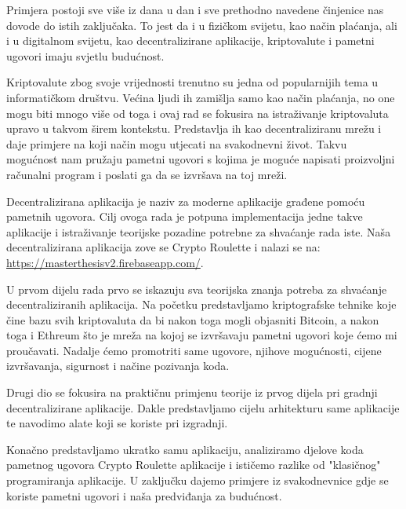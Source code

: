 \documentclass[a4paper,oneside,12pt]{memoir} %
\begin{document}
Primjera postoji sve više iz dana u dan i sve prethodno navedene činjenice nas dovode do istih zaključaka. To jest da i u fizičkom svijetu, kao način plaćanja, ali i u digitalnom svijetu, kao decentralizirane aplikacije, kriptovalute i pametni ugovori imaju svjetlu budućnost.




\pagestyle{empty} %


\begin{sazetak}
Kriptovalute zbog svoje vrijednosti trenutno su jedna od popularnijih tema u informatičkom društvu. Većina ljudi ih zamišlja samo kao način plaćanja, no one mogu biti mnogo više od toga i ovaj rad se fokusira na istraživanje kriptovaluta upravo u takvom širem kontekstu. Predstavlja ih kao decentraliziranu mrežu i daje primjere na koji način mogu utjecati na svakodnevni život. Takvu mogućnost nam pružaju pametni ugovori s kojima je moguće napisati proizvoljni računalni program i poslati ga da se izvršava na toj mreži.

Decentralizirana aplikacija je naziv za moderne aplikacije građene pomoću pametnih ugovora. Cilj ovoga rada je potpuna implementacija jedne takve aplikacije i istraživanje teorijske pozadine potrebne za shvaćanje rada iste. Naša decentralizirana aplikacija zove se Crypto Roulette i nalazi se na: \url{https://masterthesisv2.firebaseapp.com/}.

U prvom dijelu rada prvo se iskazuju sva teorijska znanja potreba za shvaćanje decentraliziranih aplikacija. Na početku predstavljamo kriptografske tehnike koje čine bazu svih kriptovaluta da bi nakon toga mogli objasniti Bitcoin, a nakon toga i Ethreum što je mreža na kojoj se izvršavaju pametni ugovori koje ćemo mi proučavati. Nadalje ćemo promotriti same ugovore, njihove mogućnosti, cijene izvršavanja, sigurnost i načine pozivanja koda.

Drugi dio se fokusira na praktičnu primjenu teorije iz prvog dijela pri gradnji decentralizirane aplikacije. Dakle predstavljamo cijelu arhitekturu same aplikacije te navodimo alate koji se koriste pri izgradnji. 

Konačno predstavljamo ukratko samu aplikaciju, analiziramo djelove koda pametnog ugovora Crypto Roulette aplikacije i ističemo razlike od "klasičnog" programiranja aplikacije. U zaključku dajemo primjere iz svakodnevnice gdje se koriste pametni ugovori i naša predviđanja za budućnost.
\end{sazetak}
\end{document}
